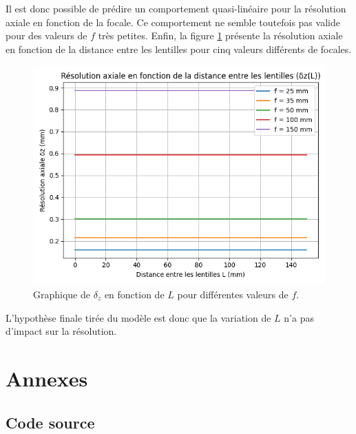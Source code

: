 \documentclass[11pt,letterpaper]{article}
\begin{document}
Il est donc possible de prédire un comportement quasi-linéaire pour la résolution axiale en fonction 
de la focale. Ce comportement ne semble toutefois pas valide pour des valeurs de $f$ très petites. Enfin,
la figure \ref{resl} présente la résolution axiale en fonction de la distance entre les lentilles pour
cinq valeurs différents de focales. 

\begin{figure}[H]
  \centering
  \includegraphics[scale=0.7]{res_vs_L.png}
  \caption{Graphique de $\delta_{z}$ en fonction de $L$ pour différentes valeurs de $f$.}
  \label{resl}
\end{figure}

L'hypothèse finale tirée du modèle est donc que la variation de $L$ n'a pas d'impact sur la résolution. 

\section{Annexes}

\subsection{Code source}
\end{document}
